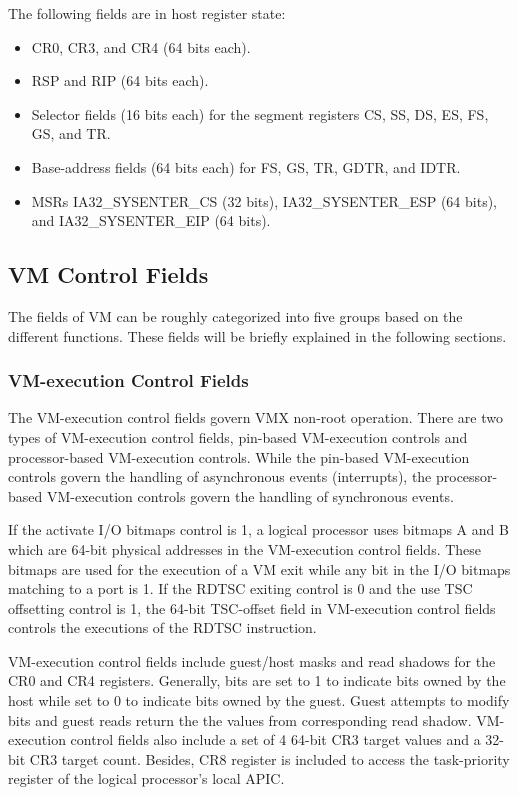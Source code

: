 \documentclass[10pt,draftclsnofoot,journal,compsoc,onecolumn]{IEEEtran}
\begin{document}
    \par The following fields are in host register state:
\begin{itemize}
  \item CR0, CR3, and CR4 (64 bits each).
  \item RSP and RIP (64 bits each).
  \item Selector fields (16 bits each) for the segment registers CS, SS, DS, ES, FS, GS, and TR.
  \item Base-address fields (64 bits each) for FS, GS, TR, GDTR, and IDTR.
  \item MSRs IA32\_SYSENTER\_CS (32 bits), IA32\_SYSENTER\_ESP (64 bits), and IA32\_SYSENTER\_EIP (64 bits).
\end{itemize}
    
\subsection{VM Control Fields}
	\par The fields of VM can be roughly categorized into five groups based on the different functions. These fields will be briefly explained in the following sections.
\subsubsection{VM-execution Control Fields}
	\par The VM-execution control fields govern VMX non-root operation. There are two types of VM-execution control fields, pin-based VM-execution controls and processor-based VM-execution controls. While the pin-based VM-execution controls govern the handling of asynchronous events (interrupts), the processor-based VM-execution controls govern the handling of synchronous events.
	\par If the activate I/O bitmaps control is 1, a logical processor uses bitmaps A and B which are 64-bit physical addresses in the VM-execution control fields. These bitmaps are used for the execution of a VM exit while any bit in the I/O bitmaps matching to a port is 1. If the RDTSC exiting control is 0 and the use TSC offsetting control is 1, the 64-bit TSC-offset field in VM-execution control fields controls the executions of the RDTSC instruction.
    \par VM-execution control fields include guest/host masks and read shadows for the CR0 and CR4 registers. Generally, bits are set to 1 to indicate bits owned by the host while set to 0 to indicate bits owned by the guest. Guest attempts to modify bits and guest reads return the the values from corresponding read shadow. VM-execution control fields also include a set of 4 64-bit CR3 target values and a 32-bit CR3 target count. Besides, CR8 register is included to access the task-priority register of the logical processor’s local APIC.
\end{document}
